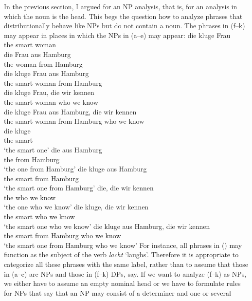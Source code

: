 \documentclass[output=paper
  ,nobabel
  ,draftmode
  ,uniformtopskip %
  ,colorlinks, citecolor=brown
]{langscibook}
\begin{document}
\largerpage
In the previous section, I argued for an NP analysis, that is, for an analysis in which the noun is the
head. This begs the question how to analyze phrases that distributionally behave like NPs but
do not contain a noun. The phrases in (f--k) may appear in places in which the NPs in
(a--e) may appear:
\eal
\ex 
\gll die kluge Frau\\
     the smart woman\\
\ex 
\gll die Frau aus Hamburg\\
     the woman from Hamburg\\
\ex 
\gll die kluge Frau aus Hamburg\\
     the smart woman from Hamburg\\
\ex 
\gll die kluge Frau, die wir kennen\\
     the smart woman who we know\\
\ex 
\gll die kluge Frau aus Hamburg, die wir kennen\\
     the smart woman from Hamburg who we know\\
\ex 
\gll die kluge\\
     the smart\\
\glt `the smart one'
\ex 
\label{ex-die-aus-hamburg} 
\gll die aus Hamburg\\
     the from Hamburg\\
\glt `the one from Hamburg'
\ex\label{ex-die-kluge-aus-hamburg} 
\gll die kluge aus Hamburg\\
     the smart from Hamburg\\
\glt `the smart one from Hamburg'
\ex 
\gll die, die wir kennen\\
     the who we know\\
\glt `the one who we know'
\ex 
\gll die kluge, die wir kennen\\
     the smart  who we know\\
\glt `the smart one who we know'
\ex 
\gll die kluge aus Hamburg, die wir kennen\\
     the smart from Hamburg who we know\\
\glt `the smart one from Hamburg who we know'
\zl
For instance, all phrases in () may function as the subject of the verb \emph{lacht}
`laughs'. Therefore it is appropriate to categorize all these phrases with the same label, rather
than to assume that those in (a--e) are NPs and those in (f--k) DPs, say. If we want
to analyze (f--k) as NPs, we either have to assume an empty nominal head or we have to
formulate rules for NPs that say that an NP may consist of a determiner and one or several
\end{document}
